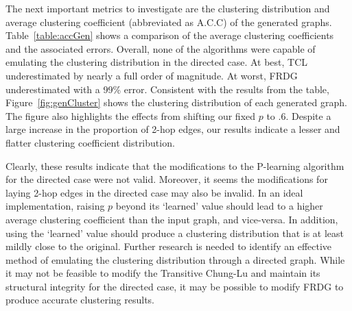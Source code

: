 \documentclass[pdftex,11pt,a4paper,twocolumn]{scrartcl}
\begin{document}
\begin{table}[h]
\centering
{}
\caption{Largest SCCs of Generated Graphs}
\label{table:sccGen}
\end{table}

The next important metrics to investigate are the clustering distribution and average clustering coefficient (abbreviated as A.C.C) of the generated graphs. Table~\ref{table:accGen} shows a comparison of the average clustering coefficients and the associated errors. Overall, none of the algorithms were capable of emulating the clustering distribution in the directed case. At best, TCL underestimated by nearly a full order of magnitude. At worst, FRDG underestimated with a 99\% error. Consistent with the results from the table, Figure~\ref{fig:genCluster} shows the clustering distribution of each generated graph. The figure also highlights the effects from shifting our fixed $p$ to $.6$. Despite a large increase in the proportion of 2-hop edges, our results indicate a lesser and flatter clustering coefficient distribution. 

Clearly, these results indicate that the modifications to the P-learning algorithm for the directed case were not valid. Moreover, it seems the modifications for laying 2-hop edges in the directed case may also be invalid. In an ideal implementation, raising $p$ beyond its `learned' value should lead to a higher average clustering coefficient than the input graph, and vice-versa. In addition, using the `learned' value should produce a clustering distribution that is at least mildly close to the original. Further research is needed to identify an effective method of emulating the clustering distribution through a directed graph. While it may not be feasible to modify the Transitive Chung-Lu and maintain its structural integrity for the directed case, it may be possible to modify FRDG to produce accurate clustering results.
\end{document}

